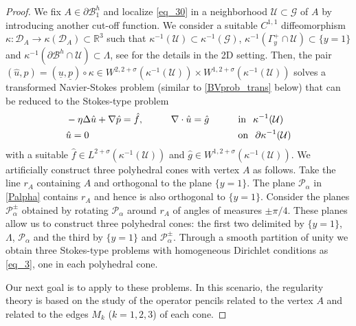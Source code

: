 \documentclass[11pt,a4paper]{amsart}
\theoremstyle{remark}
\theoremstyle{definition}
\numberwithin{equation}{section}
\numberwithin{proposition}{section}
\begin{document}
\begin{proof}
We fix $A\in \partial\mathcal{B}_1^h$ and localize \eqref{eq_30} in a neighborhood $\mathcal{U}\subset \mathcal{G}$ of $A$ by introducing another cut-off function. We consider a suitable $C^{1,1}$ diffeomorphism $\kappa: \mathcal{D}_A\rightarrow \kappa(\mathcal{D}_A)\subset \mathbb{R}^3$ such that  $\kappa^{-1}(\mathcal{U})\subset\kappa^{-1}(\mathcal{G})$, $\kappa^{-1}(\Gamma_{y}^+\cap \mathcal{U}) \subset\{y=1\}$ and $\kappa^{-1}(\partial\mathcal{B}^h \cap  \mathcal{U})\subset\Lambda$, see \cite[Proposition 6.2]{BocCasGan} for the details in the 2D setting.
Then, the pair $(\hat{u}, \hat{p})=(\underline{u}, \underline{p})\circ \kappa \in W^{2, 2+\sigma}(\kappa^{-1}(\mathcal{U}))\times W^{1, 2+\sigma}(\kappa^{-1}(\mathcal{U}))$ solves a transformed Navier-Stokes problem (similar to \eqref{BVprob_trans} below) that can be reduced to the Stokes-type problem
\begin{equation}\label{eq_3}
\begin{aligned}
&-\eta\Delta \hat{u}+\nabla \hat{p}=\hat{f},&\qquad&\nabla\cdot \hat{u}=\hat{g}&\qquad&\mbox{in}\hspace{.1in}\kappa^{-1}(\mathcal{U})\\
&\hat{u}=0&\qquad&&\qquad&\mbox{on}\hspace{.1in}\partial\kappa^{-1}(\mathcal{U})
\end{aligned}
\end{equation}
with a suitable $\hat{f}\in L^{2+\sigma}(\kappa^{-1}(\mathcal{U}))$ and $\hat{g}\in W^{1,2+\sigma}(\kappa^{-1}(\mathcal{U}))$. We artificially construct three polyhedral cones with vertex $A$ as follows. Take the line $r_A$ containing $A$ and orthogonal to the plane $\{y=1\}$. The plane $\mathcal{P}_\alpha$ in \eqref{Palpha} contains $r_A$ and hence is also orthogonal to $\{y=1\}$. Consider the planes  $\mathcal{P}_\alpha^\pm$ obtained by rotating $\mathcal{P}_\alpha$ around $r_A$ of angles of measures $\pm \pi/4$. These planes allow us to construct three polyhedral cones: the first two delimited by $\{y=1\}$, $\Lambda$, $\mathcal{P}_\alpha$ and the third by $\{y=1\}$ and $\mathcal{P}_\alpha^\pm$.
Through a smooth partition of unity we obtain three Stokes-type problems with homogeneous Dirichlet conditions as \eqref{eq_3}, one in each polyhedral cone. \par Our next goal is to apply \cite[Theorem 10.5.4]{Mazya-Rossmann2010} to these problems. In this scenario, the regularity theory is based on the study of the operator pencils related to the vertex $A$ and related to the edges $M_k$ ($k=1,2,3$) of each cone.

\end{proof}
\end{document}
